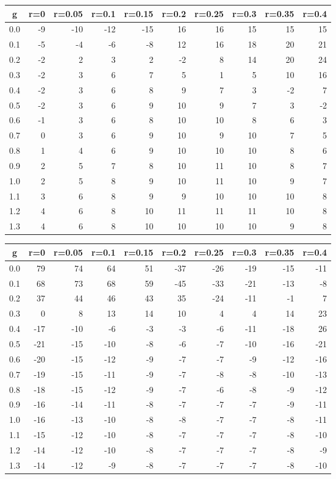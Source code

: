 %
\begin{table}[!tbp]
 \begin{center}
 \begin{tabular}{rrrrrrrrrr}\hline\hline
\multicolumn{1}{c}{g}&\multicolumn{1}{c}{r=0}&\multicolumn{1}{c}{r=0.05}&\multicolumn{1}{c}{r=0.1}&\multicolumn{1}{c}{r=0.15}&\multicolumn{1}{c}{r=0.2}&\multicolumn{1}{c}{r=0.25}&\multicolumn{1}{c}{r=0.3}&\multicolumn{1}{c}{r=0.35}&\multicolumn{1}{c}{r=0.4}\tabularnewline
\hline
0.0&-9&-10&-12&-15&16&16&15&15&15\tabularnewline
0.1&-5& -4& -6& -8&12&16&18&20&21\tabularnewline
0.2&-2&  2&  3&  2&-2& 8&14&20&24\tabularnewline
0.3&-2&  3&  6&  7& 5& 1& 5&10&16\tabularnewline
0.4&-2&  3&  6&  8& 9& 7& 3&-2& 7\tabularnewline
0.5&-2&  3&  6&  9&10& 9& 7& 3&-2\tabularnewline
0.6&-1&  3&  6&  8&10&10& 8& 6& 3\tabularnewline
0.7& 0&  3&  6&  9&10& 9&10& 7& 5\tabularnewline
0.8& 1&  4&  6&  9&10&10&10& 8& 6\tabularnewline
0.9& 2&  5&  7&  8&10&11&10& 8& 7\tabularnewline
1.0& 2&  5&  8&  9&10&11&10& 9& 7\tabularnewline
1.1& 3&  6&  8&  9& 9&10&10&10& 8\tabularnewline
1.2& 4&  6&  8& 10&11&11&11&10& 8\tabularnewline
1.3& 4&  6&  8& 10&10&10&10& 9& 8\tabularnewline
\hline
\end{tabular}

\end{center}

\end{table}

%
\begin{table}[!tbp]
 \begin{center}
 \begin{tabular}{rrrrrrrrrr}\hline\hline
\multicolumn{1}{c}{g}&\multicolumn{1}{c}{r=0}&\multicolumn{1}{c}{r=0.05}&\multicolumn{1}{c}{r=0.1}&\multicolumn{1}{c}{r=0.15}&\multicolumn{1}{c}{r=0.2}&\multicolumn{1}{c}{r=0.25}&\multicolumn{1}{c}{r=0.3}&\multicolumn{1}{c}{r=0.35}&\multicolumn{1}{c}{r=0.4}\tabularnewline
\hline
0.0& 79& 74& 64&51&-37&-26&-19&-15&-11\tabularnewline
0.1& 68& 73& 68&59&-45&-33&-21&-13& -8\tabularnewline
0.2& 37& 44& 46&43& 35&-24&-11& -1&  7\tabularnewline
0.3&  0&  8& 13&14& 10&  4&  4& 14& 23\tabularnewline
0.4&-17&-10& -6&-3& -3& -6&-11&-18& 26\tabularnewline
0.5&-21&-15&-10&-8& -6& -7&-10&-16&-21\tabularnewline
0.6&-20&-15&-12&-9& -7& -7& -9&-12&-16\tabularnewline
0.7&-19&-15&-11&-9& -7& -8& -8&-10&-13\tabularnewline
0.8&-18&-15&-12&-9& -7& -6& -8& -9&-12\tabularnewline
0.9&-16&-14&-11&-8& -7& -7& -7& -9&-11\tabularnewline
1.0&-16&-13&-10&-8& -8& -7& -7& -8&-11\tabularnewline
1.1&-15&-12&-10&-8& -7& -7& -7& -8&-10\tabularnewline
1.2&-14&-12&-10&-8& -7& -7& -7& -8& -9\tabularnewline
1.3&-14&-12& -9&-8& -7& -7& -7& -8&-10\tabularnewline
\hline
\end{tabular}

\end{center}

\end{table}

